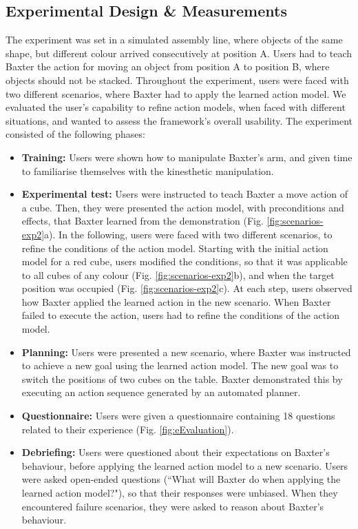 \subsection{Experimental Design \& Measurements}
The experiment was set in a simulated assembly line, where objects of the same shape, but different colour arrived consecutively at position A.
Users had to teach Baxter the action for moving an object from position A to position B, where objects should not be stacked. Throughout the experiment, users were faced with two different scenarios, where Baxter had to apply the learned action model. We evaluated the user's capability to refine action models, when faced with different situations, and wanted to assess the framework's overall usability.
The experiment consisted of the following phases:
\begin{itemize}
  \item{\textbf{Training:} Users were shown how to manipulate Baxter's arm, and given time to familiarise themselves with the kinesthetic manipulation.}
  \item{\textbf{Experimental test:} Users were instructed to teach Baxter a move action of a cube. Then, they were presented the action model, with preconditions and effects, that Baxter learned from the demonstration (Fig. \ref{fig:scenarios-exp2}a). In the following, users were faced with two different scenarios, to refine the conditions of the action model. Starting with the initial action model for a red cube, users modified the conditions, so that it was applicable to all cubes of any colour (Fig. \ref{fig:scenarios-exp2}b), and when the target position was occupied (Fig. \ref{fig:scenarios-exp2}c). At each step, users observed how Baxter applied the learned action in the new scenario. When Baxter failed to execute the action, users had to refine the conditions of the action model.}
  \item{\textbf{Planning:} Users were presented a new scenario, where Baxter was instructed to achieve a new goal using the learned action model. The new goal was to switch the positions of two cubes on the table. Baxter demonstrated this by executing an action sequence generated by an automated planner.}
  \item{\textbf{Questionnaire:} Users were given a questionnaire containing 18 questions related to their experience (Fig. \ref{fig:eEvaluation}).}
   \item{ \textbf{Debriefing:} Users were questioned about their expectations on Baxter's behaviour, before applying the learned action model to a new scenario. Users were asked open-ended questions (``What will Baxter do when applying the learned action model?"), so that their responses were unbiased. When they encountered failure scenarios, they were asked to reason about Baxter's behaviour.} 
\end{itemize}

